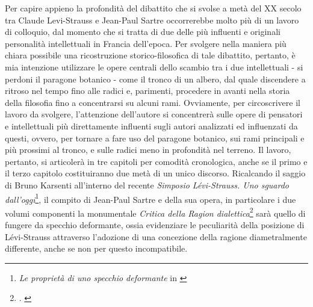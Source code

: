 Per capire appieno la profondità del dibattito che si svolse a metà del XX secolo tra Claude Levi-Strauss e Jean-Paul Sartre occorrerebbe molto più di un lavoro di colloquio, dal momento che si tratta di due delle più influenti e originali personalità intellettuali in Francia dell'epoca. Per svolgere nella maniera più chiara possibile una ricostruzione storico-filosofica di tale dibattito, pertanto, è mia intenzione utilizzare le opere centrali dello scambio tra i due intellettuali - si perdoni il paragone botanico - come il tronco di un albero, dal quale discendere a ritroso nel tempo fino alle radici e, parimenti, procedere in avanti nella storia della filosofia fino a concentrarsi su alcuni rami. Ovviamente, per circoscrivere il lavoro da svolgere, l’attenzione dell’autore si concentrerà sulle opere di pensatori e intellettuali più direttamente influenti sugli autori analizzati ed influenzati da questi, ovvero, per tornare a fare uso del paragone botanico, sui rami principali e più prossimi al tronco, e sulle radici meno in profondità nel terreno.
Il lavoro, pertanto, si articolerà in tre capitoli per comodità cronologica, anche se il primo e il terzo capitolo costituiranno due metà di un unico discorso.
Ricalcando il saggio di Bruno Karsenti all'interno del recente \textit{Simposio L\'evi-Strauss. Uno sguardo dall'oggi}\footnote{\textit{Le proprietà di uno specchio deformante} in \cite{simposio2013}}, il compito di Jean-Paul Sartre e della sua opera, in particolare i due volumi componenti la monumentale \textit{Critica della Ragion dialettica}\footnote{\cite{sartre1960critique}. \cite{sartre1984critica}} sarà quello di fungere da specchio deformante, ossia evidenziare le peculiarità della posizione di Lévi-Strauss attraverso l'adozione di una concezione della ragione diametralmente differente, anche se non per questo incompatibile.
